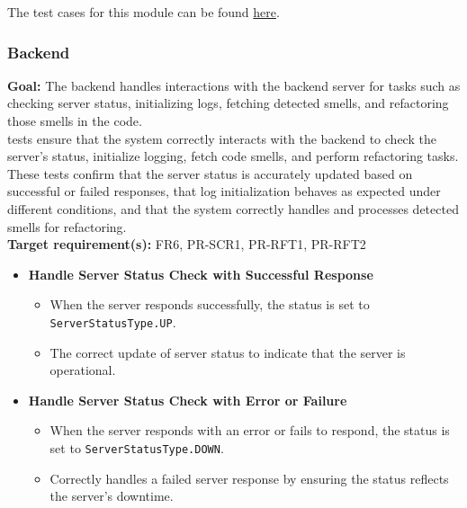 \documentclass[12pt, titlepage]{article}
\begin{document}
\begin{enumerate}[label={\bf \textcolor{Maroon}{test-SRT-\arabic*}}, wide=0pt, font=\itshape]
\noindent The test cases for this module can be found \href{https://github.com/ssm-lab/capstone--sco-vs-code-plugin/blob/plugin-multi-file/test/commands/wipeWorkCache.test.ts}{here}.

\subsubsection{Backend}

\textbf{Goal:} The backend handles interactions with the backend server for tasks such as checking server status, initializing logs, fetching detected smells, and refactoring those smells in the code.\\

\noindentThe tests ensure that the system correctly interacts with the backend to check the server's status, initialize logging, fetch code smells, and perform refactoring tasks. These tests confirm that the server status is accurately updated based on successful or failed responses, that log initialization behaves as expected under different conditions, and that the system correctly handles and processes detected smells for refactoring.\\


\noindent \textbf{Target requirement(s):} FR6, PR-SCR1, PR-RFT1, PR-RFT2~\cite{SRS} \\

\begin{itemize}
    \item \textbf{Handle Server Status Check with Successful Response}
    \begin{itemize}
        \item When the server responds successfully, the status is set to \texttt{ServerStatusType.UP}.
        \item The correct update of server status to indicate that the server is operational.
    \end{itemize}

    \item \textbf{Handle Server Status Check with Error or Failure}
    \begin{itemize}
        \item When the server responds with an error or fails to respond, the status is set to \texttt{ServerStatusType.DOWN}.
        \item Correctly handles a failed server response by ensuring the status reflects the server's downtime.
    \end{itemize}


\end{itemize}
\end{enumerate}
\end{document}
